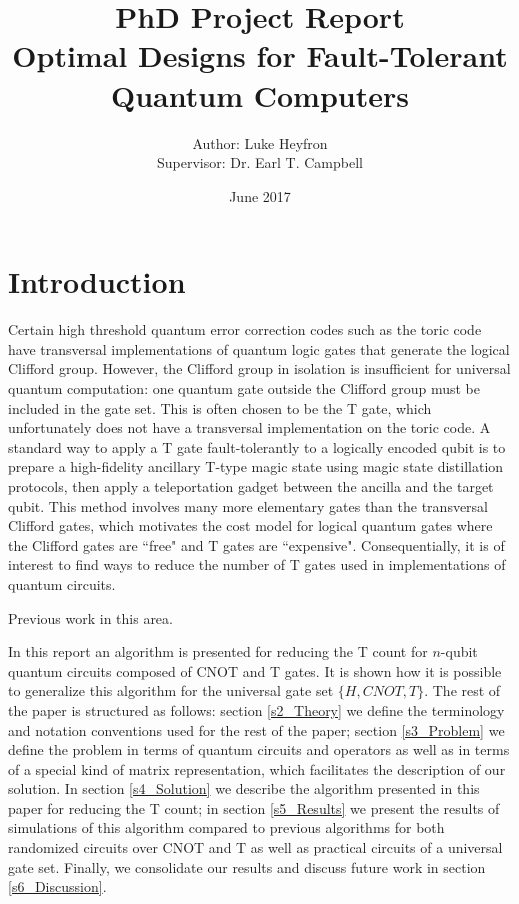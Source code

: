 \documentclass{article}
\title{PhD Project Report\\Optimal Designs for Fault-Tolerant Quantum Computers}
\author{Author: Luke Heyfron\\Supervisor: Dr. Earl T. Campbell}
\date{June 2017}
\theoremstyle{definition}
\theoremstyle{problem}
\theoremstyle{lemma}
\begin{document}
	\captionsetup{width=0.8\linewidth}
	\maketitle
	
	\section{Introduction}
	Certain high threshold quantum error correction codes such as the toric code have transversal implementations of quantum logic gates that generate the logical Clifford group.
	However, the Clifford group in isolation is insufficient for universal quantum computation: one quantum gate outside the Clifford group must be included in the gate set.
	This is often chosen to be the T gate, which unfortunately does not have a transversal implementation on the toric code.
	A standard way to apply a T gate fault-tolerantly to a logically encoded qubit is to prepare a high-fidelity ancillary T-type magic state using magic state distillation protocols, then apply a teleportation gadget between the ancilla and the target qubit. This method involves many more elementary gates than the transversal Clifford gates, which motivates the cost model for logical quantum gates where the Clifford gates are ``free" and T gates are ``expensive". Consequentially, it is of interest to find ways to reduce the number of T gates used in implementations of quantum circuits.
	
	Previous work in this area.
	
	In this report an algorithm is presented for reducing the T count for $n$-qubit quantum circuits composed of CNOT and T gates. It is shown how it is possible to generalize this algorithm for the universal gate set $\{H, CNOT, T\}$. The rest of the paper is structured as follows: section \ref{s2_Theory} we define the terminology and notation conventions used for the rest of the paper; section \ref{s3_Problem} we define the problem in terms of quantum circuits and operators as well as in terms of a special kind of matrix representation, which facilitates the description of our solution. In section \ref{s4_Solution} we describe the algorithm presented in this paper for reducing the T count; in section \ref{s5_Results} we present the results of simulations of this algorithm compared to previous algorithms for both randomized circuits over CNOT and T as well as practical circuits of a universal gate set. Finally, we consolidate our results and discuss future work in section \ref{s6_Discussion}.
	
\end{document}
